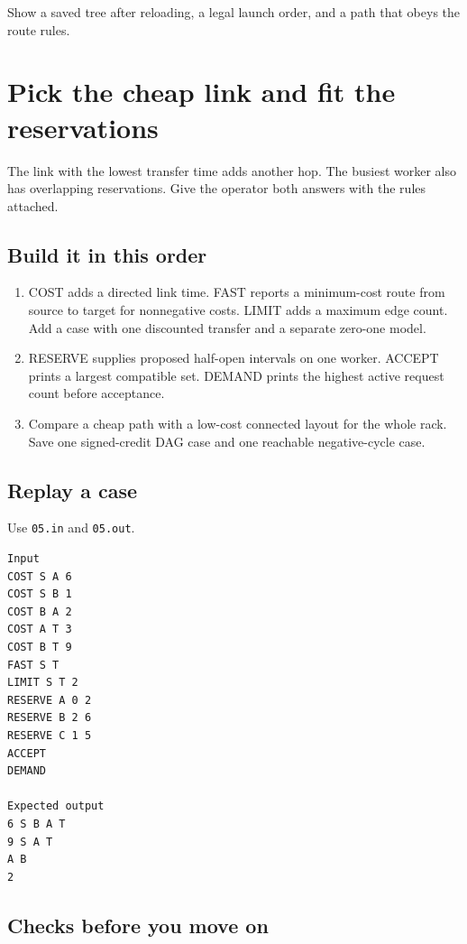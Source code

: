 \documentclass[11pt,letterpaper]{article}
\begin{document}
Show a saved tree after reloading, a legal launch order, and a path that obeys the route rules.

\clearpage

\section{Pick the cheap link and fit the reservations}\label{datacenter:05}

The link with the lowest transfer time adds another hop. The busiest worker also has overlapping reservations. Give the operator both answers with the rules attached.

\subsection*{Build it in this order}

\begin{enumerate}
\item COST adds a directed link time. FAST reports a minimum-cost route from source to target for nonnegative costs. LIMIT adds a maximum edge count. Add a case with one discounted transfer and a separate zero-one model.
\item RESERVE supplies proposed half-open intervals on one worker. ACCEPT prints a largest compatible set. DEMAND prints the highest active request count before acceptance.
\item Compare a cheap path with a low-cost connected layout for the whole rack. Save one signed-credit DAG case and one reachable negative-cycle case.
\end{enumerate}

\subsection*{Replay a case}

Use \texttt{05.in} and \texttt{05.out}.

\begin{samepage}
\small
\begin{verbatim}
Input
COST S A 6
COST S B 1
COST B A 2
COST A T 3
COST B T 9
FAST S T
LIMIT S T 2
RESERVE A 0 2
RESERVE B 2 6
RESERVE C 1 5
ACCEPT
DEMAND

Expected output
6 S B A T
9 S A T
A B
2
\end{verbatim}
\end{samepage}

\subsection*{Checks before you move on}
\end{document}
